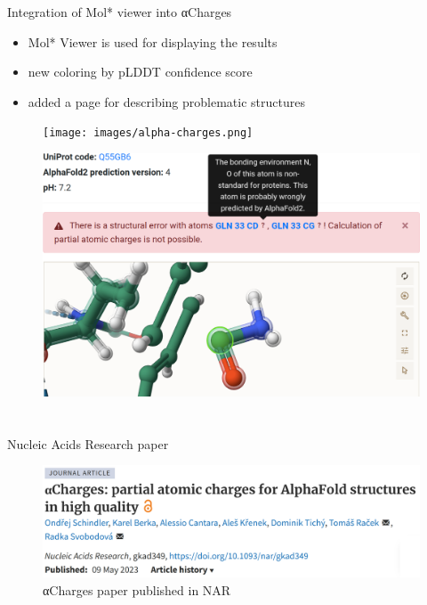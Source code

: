 \documentclass[
]{beamer}
\begin{document}
\begin{frame}{Integration of Mol* viewer into αCharges}
  \begin{itemize}
    \item Mol* Viewer is used for displaying the results
    \item new coloring by pLDDT confidence score
    \item added a page for describing problematic structures
  \end{itemize}
\end{frame}


\begin{frame}
  \begin{figure}
    \texttt{[image: images/alpha-charges.png]}
  \end{figure}
  \end{frame}

\begin{frame}
  \begin{figure}
    \includegraphics[width=1\textwidth,height=\textheight,keepaspectratio]{images/focus.png}
  \end{figure}
  \end{frame}

\section[]{}

\begin{frame}{Nucleic Acids Research paper}
\begin{figure}
  \includegraphics[width=1\textwidth,keepaspectratio]{images/paper.png}
  \caption{αCharges paper published in NAR \cite{schindler2023acharges}}
\end{figure}
\end{frame}
\end{document}
